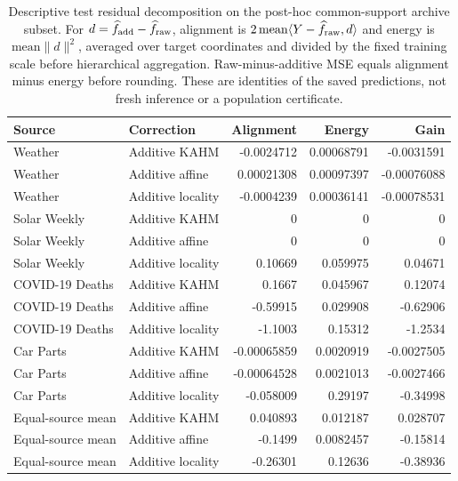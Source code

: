 \begin{table}[!htbp]
\centering\small\setlength{\tabcolsep}{4pt}
\caption{Descriptive test residual decomposition on the post-hoc common-support archive subset. For $d=\widehat f_{\rm add}-\widehat f_{\rm raw}$, alignment is $2\,\mathrm{mean}\langle Y-\widehat f_{\rm raw},d\rangle$ and energy is $\mathrm{mean}\|d\|^2$, averaged over target coordinates and divided by the fixed training scale before hierarchical aggregation. Raw-minus-additive MSE equals alignment minus energy before rounding. These are identities of the saved predictions, not fresh inference or a population certificate.}
\label{tab:utility-residual}
\begin{tabular}{llrrr}
\toprule
Source & Correction & Alignment & Energy & Gain \\
\midrule
Weather & Additive KAHM & -0.0024712 & 0.00068791 & -0.0031591 \\
Weather & Additive affine & 0.00021308 & 0.00097397 & -0.00076088 \\
Weather & Additive locality & -0.0004239 & 0.00036141 & -0.00078531 \\
Solar Weekly & Additive KAHM & 0 & 0 & 0 \\
Solar Weekly & Additive affine & 0 & 0 & 0 \\
Solar Weekly & Additive locality & 0.10669 & 0.059975 & 0.04671 \\
COVID-19 Deaths & Additive KAHM & 0.1667 & 0.045967 & 0.12074 \\
COVID-19 Deaths & Additive affine & -0.59915 & 0.029908 & -0.62906 \\
COVID-19 Deaths & Additive locality & -1.1003 & 0.15312 & -1.2534 \\
Car Parts & Additive KAHM & -0.00065859 & 0.0020919 & -0.0027505 \\
Car Parts & Additive affine & -0.00064528 & 0.0021013 & -0.0027466 \\
Car Parts & Additive locality & -0.058009 & 0.29197 & -0.34998 \\
\midrule
Equal-source mean & Additive KAHM & 0.040893 & 0.012187 & 0.028707 \\
Equal-source mean & Additive affine & -0.1499 & 0.0082457 & -0.15814 \\
Equal-source mean & Additive locality & -0.26301 & 0.12636 & -0.38936 \\
\bottomrule
\end{tabular}
\end{table}
